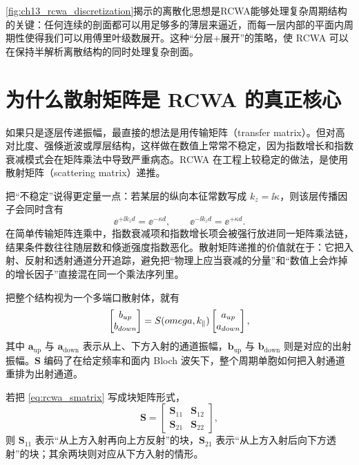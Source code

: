 \cref{fig:ch13_rcwa_discretization}揭示的离散化思想是RCWA能够处理复杂周期结构的关键：任何连续的剖面都可以用足够多的薄层来逼近，而每一层内部的平面内周期性使得我们可以用傅里叶级数展开。这种“分层+展开”的策略，使 RCWA 可以在保持半解析离散结构的同时处理复杂剖面。

\section{为什么散射矩阵是 RCWA 的真正核心}
如果只是逐层传递振幅，最直接的想法是用传输矩阵（transfer matrix）。但对高对比度、强倏逝波或厚层结构，这样做在数值上常常不稳定，因为指数增长和指数衰减模式会在矩阵乘法中导致严重病态。RCWA 在工程上较稳定的做法，是使用散射矩阵（scattering matrix）递推。

把“不稳定”说得更定量一点：若某层的纵向本征常数写成 $k_z=\ii\kappa$，则该层传播因子会同时含有
\[
\ee^{+\ii k_z d}=\ee^{-\kappa d},
\qquad
\ee^{-\ii k_z d}=\ee^{+\kappa d}.
\]
在简单传输矩阵连乘中，指数衰减项和指数增长项会被强行放进同一矩阵乘法链，结果条件数往往随层数和倏逝强度指数恶化。散射矩阵递推的价值就在于：它把入射、反射和透射通道分开追踪，避免把“物理上应当衰减的分量”和“数值上会炸掉的增长因子”直接混在同一个乘法序列里。

把整个结构视为一个多端口散射体，就有
\begin{equation}
\begin{bmatrix}
b_{up}\\
b_{down}
\end{bmatrix}
=
S(omega,k_\parallel)
\begin{bmatrix}
a_{up}\\
a_{down}
\end{bmatrix},
\label{eq:rcwa_smatrix}
\end{equation}
其中 $\bm{a}_{\mathrm{up}}$ 与 $\bm{a}_{\mathrm{down}}$ 表示从上、下方入射的通道振幅，$\bm{b}_{\mathrm{up}}$ 与 $\bm{b}_{\mathrm{down}}$ 则是对应的出射振幅。$\mathbf{S}$ 编码了在给定频率和面内 Bloch 波矢下，整个周期单胞如何把入射通道重排为出射通道。

若把 \cref{eq:rcwa_smatrix} 写成块矩阵形式，
\[
\mathbf{S}=
\begin{bmatrix}
\mathbf{S}_{11} & \mathbf{S}_{12}\\
\mathbf{S}_{21} & \mathbf{S}_{22}
\end{bmatrix},
\]
则 $\mathbf{S}_{11}$ 表示“从上方入射再向上方反射”的块，$\mathbf{S}_{21}$ 表示“从上方入射后向下方透射”的块；其余两块则对应从下方入射的情形。

